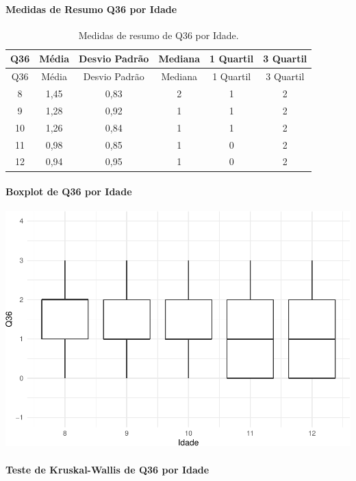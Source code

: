 \documentclass[]{article}
\let\oldparagraph\paragraph
\renewcommand{\paragraph}[1]{\oldparagraph{#1}\mbox{}}
\begin{document}
\cleardoublepage

\hypertarget{medidas-de-resumo-q36-por-idade}{%
\paragraph{Medidas de Resumo Q36 por Idade}\label{medidas-de-resumo-q36-por-idade}}

\begin{longtable}[]{@{}cccccc@{}}
\caption{\label{tab:unnamed-chunk-1335}Medidas de resumo de Q36 por Idade.}\tabularnewline
\toprule
Q36 & Média & Desvio Padrão & Mediana & 1 Quartil & 3 Quartil\tabularnewline
\midrule
\endfirsthead
\toprule
Q36 & Média & Desvio Padrão & Mediana & 1 Quartil & 3 Quartil\tabularnewline
\midrule
\endhead
8 & 1,45 & 0,83 & 2 & 1 & 2\tabularnewline
9 & 1,28 & 0,92 & 1 & 1 & 2\tabularnewline
10 & 1,26 & 0,84 & 1 & 1 & 2\tabularnewline
11 & 0,98 & 0,85 & 1 & 0 & 2\tabularnewline
12 & 0,94 & 0,95 & 1 & 0 & 2\tabularnewline
\bottomrule
\end{longtable}

\hypertarget{boxplot-de-q36-por-idade}{%
\paragraph{Boxplot de Q36 por Idade}\label{boxplot-de-q36-por-idade}}

\begin{center}\includegraphics[width=0.75\linewidth]{relatorio_covid19_files/figure-latex/unnamed-chunk-1336-1} \end{center}

\hypertarget{teste-de-kruskal-wallis-de-q36-por-idade}{%
\paragraph{Teste de Kruskal-Wallis de Q36 por Idade}\label{teste-de-kruskal-wallis-de-q36-por-idade}}
\end{document}
